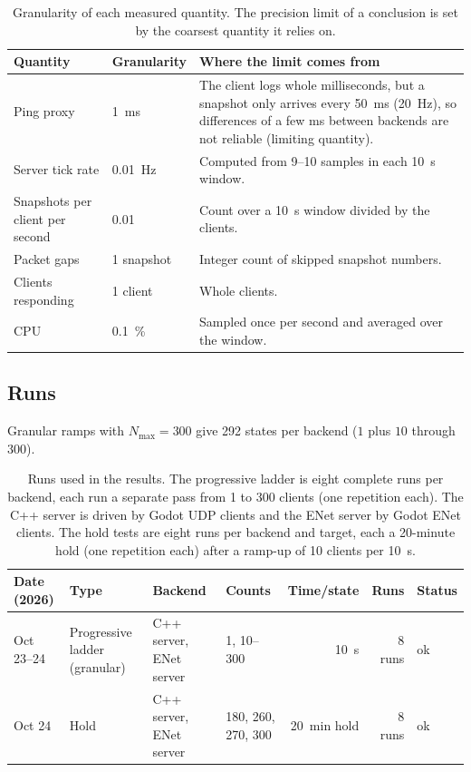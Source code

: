 \documentclass[11pt]{article}
\begin{document}
\begin{table}[H]
\centering
\footnotesize
\begin{tabular}{@{}llp{6.2cm}@{}}
\toprule
Quantity & Granularity & Where the limit comes from \\
\midrule
Ping proxy & 1~ms & The client logs whole milliseconds, but a snapshot only arrives every 50~ms (20~Hz), so differences of a few ms between backends are not reliable (limiting quantity). \\
Server tick rate & 0.01~Hz & Computed from 9--10 samples in each 10~s window. \\
Snapshots per client per second & 0.01 & Count over a 10~s window divided by the clients. \\
Packet gaps & 1 snapshot & Integer count of skipped snapshot numbers. \\
Clients responding & 1 client & Whole clients. \\
CPU & 0.1~\% & Sampled once per second and averaged over the window. \\
\bottomrule
\end{tabular}
\caption{Granularity of each measured quantity. The precision limit of a conclusion is set by the coarsest quantity it relies on.}
\label{tab:precision}
\end{table}

\subsection{Runs}

Granular ramps with $N_{\max}=300$ give 292 states per backend
($1$ plus $10$ through $300$).

\begin{table}[H]
\centering
\footnotesize
\setlength{\tabcolsep}{3pt}
\begin{tabular}{@{}llllrrl@{}}
\toprule
Date (2026) & Type & Backend & Counts & Time/state & Runs & Status \\
\midrule
Oct 23--24 & Progressive ladder (granular) & C++ server, ENet server & 1, 10--300 & 10~s & 8 runs & ok \\
Oct 24 & Hold & C++ server, ENet server & 180, 260, 270, 300 & 20~min hold & 8 runs & ok \\
\bottomrule
\end{tabular}
\caption{Runs used in the results. The progressive ladder is eight complete runs per backend, each run a separate pass from 1 to 300 clients (one repetition each). The C++ server is driven by Godot UDP clients and the ENet server by Godot ENet clients. The hold tests are eight runs per backend and target, each a 20-minute hold (one repetition each) after a ramp-up of 10 clients per 10~s.}
\end{table}
\end{document}
